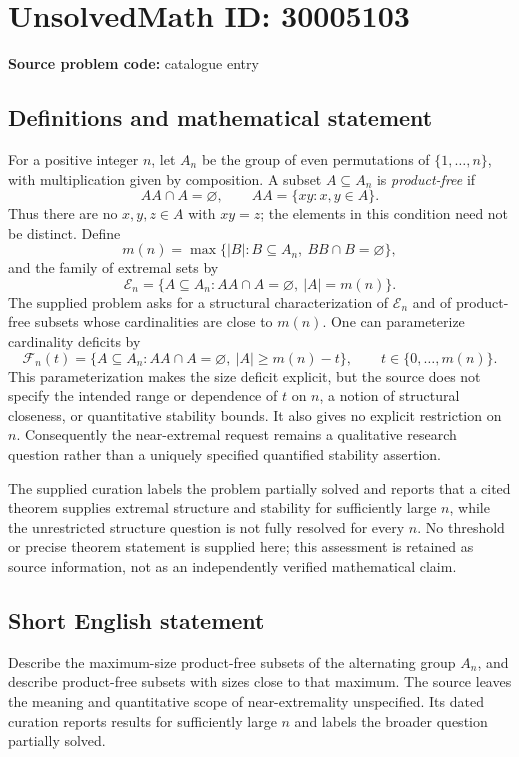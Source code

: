 \documentclass[11pt]{article}
\begin{document}
\section*{UnsolvedMath ID: 30005103}
\textbf{Source problem code:} catalogue entry
\subsection{Definitions and mathematical statement}
For a positive integer \(n\), let \(A_n\) be the group of even permutations of \(\{1,\ldots,n\}\), with multiplication given by composition. A subset \(A\subseteq A_n\) is \emph{product-free} if
\[
AA\cap A=\varnothing,\qquad AA=\{xy:x,y\in A\}.
\]
Thus there are no \(x,y,z\in A\) with \(xy=z\); the elements in this condition need not be distinct. Define
\[
m(n)=\max\{|B|:B\subseteq A_n,\ BB\cap B=\varnothing\},
\]
and the family of extremal sets by
\[
\mathcal E_n=\{A\subseteq A_n:AA\cap A=\varnothing,\ |A|=m(n)\}.
\]
The supplied problem asks for a structural characterization of \(\mathcal E_n\) and of product-free subsets whose cardinalities are close to \(m(n)\). One can parameterize cardinality deficits by
\[
\mathcal F_n(t)=\{A\subseteq A_n:AA\cap A=\varnothing,\ |A|\ge m(n)-t\},
\qquad t\in\{0,\ldots,m(n)\}.
\]
This parameterization makes the size deficit explicit, but the source does not specify the intended range or dependence of \(t\) on \(n\), a notion of structural closeness, or quantitative stability bounds. It also gives no explicit restriction on \(n\). Consequently the near-extremal request remains a qualitative research question rather than a uniquely specified quantified stability assertion.

The supplied curation labels the problem partially solved and reports that a cited theorem supplies extremal structure and stability for sufficiently large \(n\), while the unrestricted structure question is not fully resolved for every \(n\). No threshold or precise theorem statement is supplied here; this assessment is retained as source information, not as an independently verified mathematical claim.
\subsection{Short English statement}
Describe the maximum-size product-free subsets of the alternating group \(A_n\), and describe product-free subsets with sizes close to that maximum. The source leaves the meaning and quantitative scope of near-extremality unspecified. Its dated curation reports results for sufficiently large \(n\) and labels the broader question partially solved.
\end{document}

